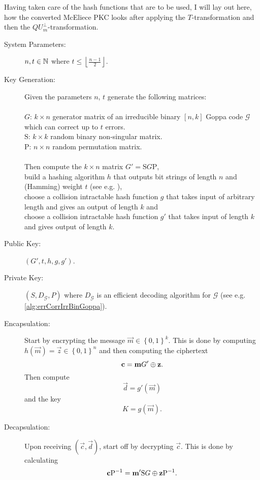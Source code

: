 Having taken care of the hash functions that are to be used, I will lay out here, how the converted McEliece PKC looks after applying the $T$-transformation and then the $QU^{\bot}_m$-transformation.

\begin{description}
	\item[System Parameters:] $n,t \in \mathbb{N}$ where $t \leq \left\lfloor \frac{n-1}{2} \right\rfloor$.
	\item[Key Generation:] Given the parameters $n$, $t$ generate the following matrices:
		\\~\\
		$G$: $k \times n$ generator matrix of an irreducible binary $\left[n,k\right]$ Goppa code $\mathcal{G}$ which can correct up to $t$ errors.\\
		$\mathrm{S}$: $k \times k$ random binary non-singular matrix.\\
		$\mathrm{P}$: $n \times n$ random permutation matrix.
		\\~\\
		Then compute the $k \times n$ matrix $G' = \mathrm{S}G\mathrm{P}$,\\
		build a hashing algorithm $h$ that outputs bit strings of length $n$ and (Hamming) weight $t$ (see e.g. \cite{BP}),\\
		choose a collision intractable hash function $g$ that takes input of arbitrary length and gives an output of length $k$ and\\
		choose a collision intractable hash function $g'$ that takes input of length $k$ and gives output of length $k$.
	\item[Public Key:] $\left(G', t, h, g, g'\right)$.
	\item[Private Key:] $\left(S, D_{\mathcal{G}}, P\right)$ where $D_{\mathcal{G}}$ is an efficient decoding algorithm for $\mathcal{G}$ (see e.g. \cref{alg:errCorrIrrBinGoppa}).
	\item[Encapsulation:] Start by encrypting the message $\vec{m} \in \left\{ 0,1 \right\}^k$. This is done by computing $h\left(\vec{m}\right) = \vec{z} \in \left\{ 0,1 \right\}^n$ and then computing the ciphertext
		\[
			\boldsymbol{\mathrm{c}} = \boldsymbol{\mathrm{m}} G' \mathbin{\oplus} \boldsymbol{\mathrm{z}}.
		\]
		Then compute
		\[
			\vec{d} = g'\left(\vec{m}\right)
		\]
		and the key
		\[
			K = g\left(\vec{m}\right).
		\]
	\item[Decapsulation:] Upon receiving $\left(\vec{c}, \vec{d}\right)$, start off by decrypting $\vec{c}$. This is done by calculating
		\[
			\boldsymbol{\mathrm{c}}\mathrm{P}^{-1} = \boldsymbol{\mathrm{m}}'\mathrm{S}G \mathbin{\oplus} \boldsymbol{\mathrm{z}}\mathrm{P}^{-1}.
\]
\end{description}
